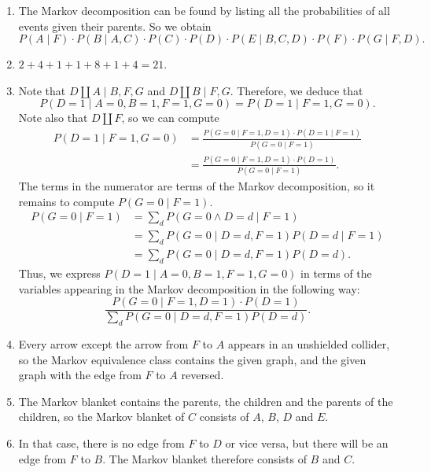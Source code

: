 \documentclass{article}
\newcommand{\cprob}[2]{\prob{#1\mathbin|#2}}
\newcommand{\prob}[1]{P(#1)}
\newcommand{\indep}[2]{#1\mathbin{\amalg}#2}
\newcommand{\cindep}[3]{\indep{#1}{#2}\mid #3}
\begin{document}
\maketitle

\begin{ex}
\begin{enumerate}
\item The Markov decomposition can be found by listing all the probabilities of
all events given their parents. So we obtain
\begin{equation*}
\cprob{A}{F}
  \cdot
\cprob{B}{A,C}
  \cdot
\prob{C}
  \cdot
\prob{D}
  \cdot
\cprob{E}{B,C,D}
  \cdot
\prob{F}
  \cdot
\cprob{G}{F,D}.
\end{equation*}
\item $2+4+1+1+8+1+4=21$.
\item Note that $\cindep{D}{A}{B,F,G}$ and $\cindep{D}{B}{F,G}$. Therefore,
we deduce that
\begin{equation*}
\cprob{D=1}{A=0,B=1,F=1,G=0}=\cprob{D=1}{F=1,G=0}.
\end{equation*}
Note also that $\indep{D}{F}$, so we can compute
\begin{align*}
\cprob{D=1}{F=1,G=0}
  & =
\frac
  {\cprob{G=0}{F=1,D=1}\cdot\cprob{D=1}{F=1}}
  {\cprob{G=0}{F=1}}
  \\
  & =
\frac
  {\cprob{G=0}{F=1,D=1}\cdot\prob{D=1}}
  {\cprob{G=0}{F=1}}.
\end{align*}
The terms in the numerator are terms of the Markov decomposition, so it remains 
to compute $\cprob{G=0}{F=1}$. 
\begin{align*}
\cprob{G=0}{F=1}
  & =
\sum_d \cprob{G=0\land D=d}{F=1}
  \\
  & =
\sum_d \cprob{G=0}{D=d,F=1}\cprob{D=d}{F=1}
  \\
  & =
\sum_d \cprob{G=0}{D=d,F=1}\prob{D=d}.
\end{align*}
Thus, we express $\cprob{D=1}{A=0,B=1,F=1,G=0}$ in terms of the variables
appearing in the Markov decomposition in the following way:
\begin{equation*}
\frac
  {\cprob{G=0}{F=1,D=1}\cdot\prob{D=1}}
  {\sum_d \cprob{G=0}{D=d,F=1}\prob{D=d}}.
\end{equation*}
\item Every arrow except the arrow from $F$ to $A$ appears in an unshielded
collider, so the Markov equivalence class contains the given graph, and the
given graph with the edge from $F$ to $A$ reversed.
\item The Markov blanket contains the parents, the children and the parents of
the children, so the Markov blanket of $C$ consists of $A$, $B$, $D$ and $E$.
\item In that case, there is no edge from $F$ to $D$ or vice versa, but there
will be an edge from $F$ to $B$. The Markov blanket therefore consists of $B$
and $C$.
\end{enumerate}
\end{ex}
\end{document}
